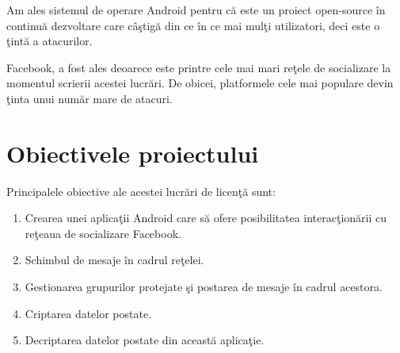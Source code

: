 Am ales sistemul de operare Android pentru c\u{a} este un proiect open-source \^{i}n continu\u{a} dezvoltare care c\^{a}\c{s}tig\u{a} din ce \^{i}n ce mai mul\c{t}i utilizatori, deci este o \c{t}int\u{a} a atacurilor.

Facebook, a fost ales deoarece este printre cele mai mari re\c{t}ele de socializare la momentul scrierii acestei lucr\u{a}ri. De obicei, platformele cele mai populare devin \c{t}inta unui num\u{a}r mare de atacuri.

\section{Obiectivele proiectului}
\label{sub-sec:proj-objectives}

Principalele obiective ale acestei lucr\u{a}ri de licen\c{t}\u{a} sunt: 

\begin{enumerate}
\item Crearea unei aplica\c{t}ii Android care s\u{a} ofere posibilitatea interac\c{t}ion\u{a}rii cu re\c{t}eaua de socializare Facebook.
\item Schimbul de mesaje \^{i}n cadrul re\c{t}elei.
\item Gestionarea grupurilor protejate \c{s}i postarea de mesaje \^{i}n cadrul acestora.
\item Criptarea datelor postate.
\item Decriptarea datelor postate din aceast\u{a} aplica\c{t}ie.
\end{enumerate}


